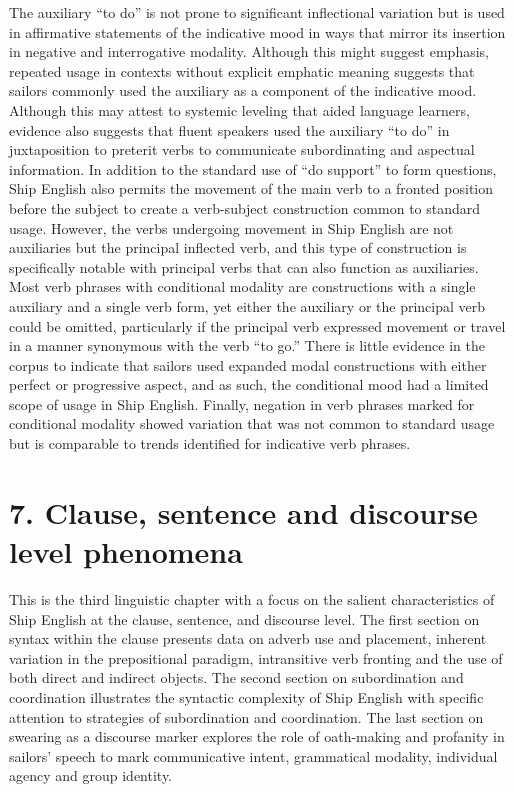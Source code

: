 The auxiliary “to do” is not prone to significant inflectional variation but is used in affirmative statements of the indicative mood in ways that mirror its insertion in negative and interrogative modality. Although this might suggest emphasis, repeated usage in contexts without explicit emphatic meaning suggests that sailors commonly used the auxiliary as a component of the indicative mood. Although this may attest to systemic leveling that aided language learners, evidence also suggests that fluent speakers used the auxiliary “to do” in juxtaposition to preterit verbs to communicate subordinating and aspectual information. In addition to the standard use of “do support” to form questions, Ship English also permits the movement of the main verb to a fronted position before the subject to create a verb-subject construction common to standard usage. However, the verbs undergoing movement in Ship English are not auxiliaries but the principal inflected verb, and this type of construction is specifically notable with principal verbs that can also function as auxiliaries. Most verb phrases with conditional modality are constructions with a single auxiliary and a single verb form, yet either the auxiliary or the principal verb could be omitted, particularly if the principal verb expressed movement or travel in a manner synonymous with the verb “to go.” There is little evidence in the corpus to indicate that sailors used expanded modal constructions with either perfect or progressive aspect, and as such, the conditional mood had a limited scope of usage in Ship English. Finally, negation in verb phrases marked for conditional modality showed variation that was not common to standard usage but is comparable to trends identified for indicative verb phrases. 

\chapter{\textbf{7.} \textbf{Clause,} \textbf{sentence} \textbf{and} \textbf{discourse} \textbf{level} \textbf{phenomena}}

This is the third linguistic chapter with a focus on the salient characteristics of Ship English at the clause, sentence, and discourse level. The first section on syntax within the clause presents data on adverb use and placement, inherent variation in the prepositional paradigm, intransitive verb fronting and the use of both direct and indirect objects. The second section on subordination and coordination illustrates the syntactic complexity of Ship English with specific attention to strategies of subordination and coordination. The last section on swearing as a discourse marker explores the role of oath-making and profanity in sailors’ speech to mark communicative intent, grammatical modality, individual agency and group identity. 

